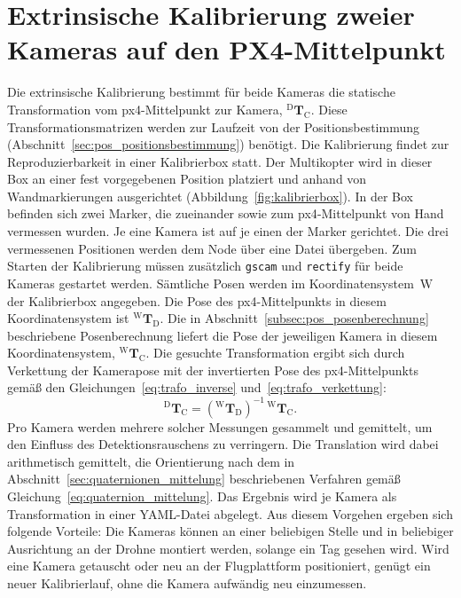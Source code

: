 \section{Extrinsische Kalibrierung zweier Kameras auf den PX4-Mittelpunkt}
\label{subsec:extrinsische_kalibrierung}
Die extrinsische Kalibrierung bestimmt für beide Kameras die statische Transformation vom \gls{px4}-Mittelpunkt zur Kamera, 
$^{\mathrm{D}}\mathbf{T}_{\mathrm{C}}$.
Diese Transformationsmatrizen werden zur Laufzeit von der Positionsbestimmung (Abschnitt~\ref{sec:pos_positionsbestimmung}) benötigt.
Die Kalibrierung findet zur Reproduzierbarkeit in einer Kalibrierbox statt.
Der Multikopter wird in dieser Box an einer fest vorgegebenen Position platziert und anhand von Wandmarkierungen ausgerichtet 
(Abbildung~\ref{fig:kalibrierbox}).
In der Box befinden sich zwei Marker, die zueinander sowie zum \gls{px4}-Mittelpunkt von Hand vermessen wurden.
Je eine Kamera ist auf je einen der Marker gerichtet.
Die drei vermessenen Positionen werden dem Node über eine Datei übergeben.
Zum Starten der Kalibrierung müssen zusätzlich \texttt{gscam} und \texttt{rectify} für beide Kameras gestartet werden.
Sämtliche Posen werden im Koordinatensystem~$\mathrm{W}$ der Kalibrierbox angegeben.
Die Pose des \gls{px4}-Mittelpunkts in diesem Koordinatensystem ist $^{\mathrm{W}}\mathbf{T}_{\mathrm{D}}$.
Die in Abschnitt~\ref{subsec:pos_posenberechnung} beschriebene Posenberechnung liefert die Pose der jeweiligen Kamera in diesem Koordinatensystem, $^{\mathrm{W}}\mathbf{T}_{\mathrm{C}}$.
Die gesuchte Transformation ergibt sich durch Verkettung der Kamerapose mit der invertierten Pose des \gls{px4}-Mittelpunkts gemäß den Gleichungen~\eqref{eq:trafo_inverse} und~\eqref{eq:trafo_verkettung}:
\begin{equation}
^{\mathrm{D}}\mathbf{T}_{\mathrm{C}} = \left(^{\mathrm{W}}\mathbf{T}_{\mathrm{D}}\right)^{-1}\,{^{\mathrm{W}}\mathbf{T}_{\mathrm{C}}}.
\label{eq:extrinsik}
\end{equation}
Pro Kamera werden mehrere solcher Messungen gesammelt und gemittelt, um den Einfluss des Detektionsrauschens zu verringern.
Die Translation wird dabei arithmetisch gemittelt, die Orientierung nach dem in Abschnitt~\ref{sec:quaternionen_mittelung} beschriebenen Verfahren gemäß Gleichung~\eqref{eq:quaternion_mittelung}.
Das Ergebnis wird je Kamera als Transformation in einer YAML-Datei abgelegt.
Aus diesem Vorgehen ergeben sich folgende Vorteile:
Die Kameras können an einer beliebigen Stelle und in beliebiger Ausrichtung an der Drohne montiert werden, solange ein Tag gesehen wird. 
Wird eine Kamera getauscht oder neu an der Flugplattform positioniert, genügt ein neuer Kalibrierlauf, ohne die Kamera aufwändig neu einzumessen. 



